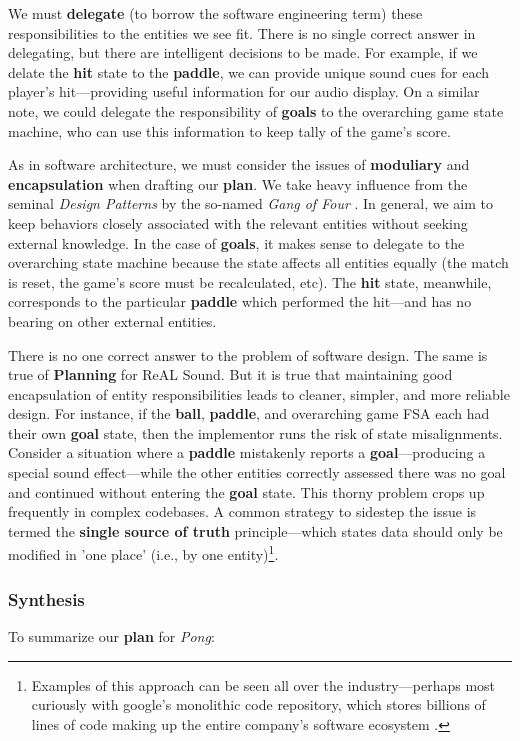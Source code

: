 \documentclass{report}
\newcommand{\rs}{ReAL Sound\xspace}
\newcommand{\plan}{\textbf{Planning}\xspace}
\newcommand{\state}[1]{\textbf{#1}}
\newcommand{\pad}{\textbf{paddle}\xspace}
\newcommand{\ball}{\textbf{ball}\xspace}
\newcommand{\tech}[1]{\textbf{#1}}
\begin{document}
We must \tech{delegate} (to borrow the software engineering term) these responsibilities to the entities we see fit. There is no single correct answer in delegating, but there are intelligent decisions to be made. For example, if we delate the \state{hit} state to the \pad, we can provide unique sound cues for each player's hit---providing useful information for our audio display. On a similar note, we could delegate the responsibility of \state{goals} to the overarching game state machine, who can use this information to keep tally of the game's score. 

As in software architecture, we must consider the issues of \tech{moduliary} and \tech{encapsulation} when drafting our \state{plan}. We take heavy influence from the seminal \emph{Design Patterns} by the so-named \emph{Gang of Four} \cite{gamma1994design}. In general, we aim to keep behaviors closely associated with the relevant entities without seeking external knowledge. In the case of \state{goals}, it makes sense to delegate to the overarching state machine because the state affects all entities equally (the match is reset, the game's score must be recalculated, etc). The \state{hit} state, meanwhile, corresponds to the particular \pad which performed the hit---and has no bearing on other external entities. 

There is no one correct answer to the problem of software design. The same is true of \plan for \rs. But it is true that maintaining good encapsulation of entity responsibilities leads to cleaner, simpler, and more reliable design. For instance, if the \ball, \pad, and overarching game FSA each had their own \state{goal} state, then the implementor runs the risk of state misalignments. Consider a situation where a \pad mistakenly reports a \state{goal}---producing a special sound effect---while the other entities correctly assessed there was no goal and continued without entering the \state{goal} state. This thorny problem crops up frequently in complex codebases. A common strategy to sidestep the issue is termed the \tech{single source of truth} principle---which states data should only be modified in 'one place' (i.e., by one entity)\footnote{Examples of this approach can be seen all over the industry---perhaps most curiously with google's monolithic code repository, which stores billions of lines of code making up the entire company's software ecosystem \cite{googleRepo}.}.

\subsubsection{Synthesis}
To summarize our \state{plan} for \emph{Pong}:
\end{document}
